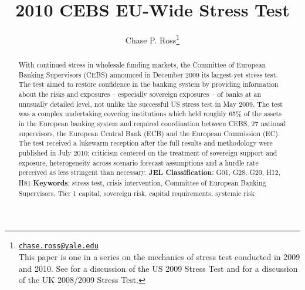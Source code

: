 \documentclass[12pt]{article}
\begin{document}
\lhead{ }

\renewcommand{\headrulewidth}{0.0pt}
\renewcommand{\footrulewidth}{0.0pt}


\title{2010 CEBS EU-Wide Stress Test}%
\author{Chase P. Ross\thanks{\texttt{\href{mailto:chase.ross@yale.edu}{chase.ross@yale.edu}} \\ This paper is one in a series on the mechanics of stress test conducted in 2009 and 2010. See \citet{Ross2016a} for a discussion of the US 2009 Stress Test and \citet{Ross2016b} for a discussion of the UK 2008/2009 Stress Test.}}



\maketitle

\begin{abstract}
With continued stress in wholesale funding markets, the Committee of European Banking Supervisors (CEBS) announced in December 2009 its largest-yet stress test. The test aimed to restore confidence in the banking system by providing information about the risks and exposures -- especially sovereign exposures -- of banks at an unusually detailed level, not unlike the successful US stress test in May 2009. The test was a complex undertaking covering institutions which held roughly 65\% of the assets in the European banking system and required coordination between CEBS, 27 national supervisors, the European Central Bank (ECB) and the European Commission (EC). The test received a lukewarm reception after the full results and methodology were published in July 2010; criticism centered on the treatment of sovereign support and exposure, heterogeneity across scenario forecast assumptions and a hurdle rate perceived as less stringent than necessary.
\newline
\newline
\textbf{JEL Classification}: G01, G28, G20, H12, H81
\newline
\newline
\textbf{Keywords}: stress test, crisis intervention, Committee of European Banking Supervisors, Tier 1 capital, sovereign risk, capital requirements, systemic risk

\end{abstract}
\newpage
\tableofcontents
\newpage
\end{document}
